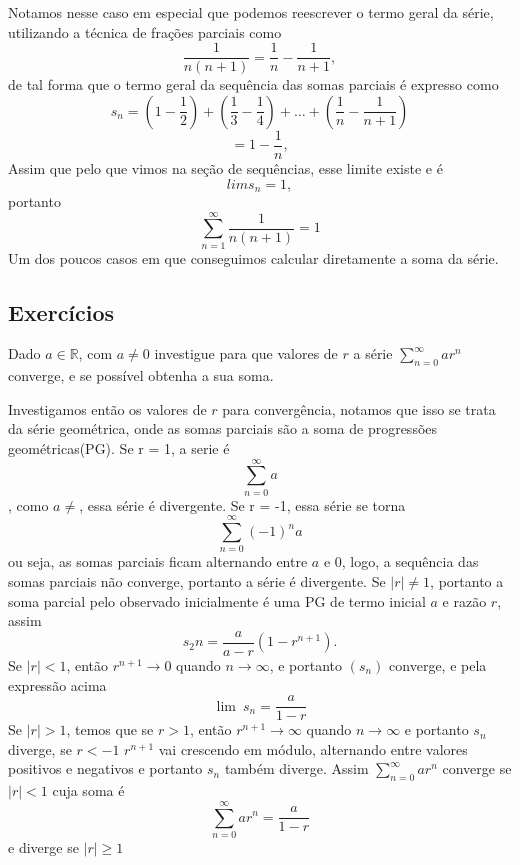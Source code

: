 \begin{resol}
    Notamos nesse caso em especial que podemos reescrever o termo geral da série,
    utilizando a técnica de frações parciais como
    $$\frac{1}{n(n+1)} = \frac{1}{n} - \frac{1}{n+1},$$
    de tal forma que o termo geral da sequência das somas parciais é expresso como
    $$s_n = (1 - \frac{1}{2})+(\frac{1}{3}-\frac{1}{4})+\dots+(\frac{1}{n}-\frac{1}{n+1})$$
    $$ = 1 - \frac{1}{n},$$
    Assim que pelo que vimos na seção de sequências, esse limite existe e é
    $$lim s_n = 1,$$
    portanto
    $$\sum_{n = 1}^{\infty} \frac{1}{n(n+1)} = 1$$
    Um dos poucos casos em que conseguimos calcular diretamente a soma da série.
\end{resol}

\subsection*{Exercícios}

\construirExer

\begin{exer}
    Dado $a \in \mathbb{R}$, com $a \neq 0$ investigue para que valores de $r$ a
    série $\sum_{n = 0}^{\infty} ar^n$ converge, e se possível obtenha a sua soma.
\end{exer}

\begin{resp}
    Investigamos então os valores de $r$ para convergência, notamos que isso se
    trata da série geométrica, onde as somas parciais são a soma de progressões
    geométricas(PG). Se r = 1, a serie é 
    $$ \sum_{n = 0}^{\infty} a$$,
    como $a \neq $, essa série é divergente.
    Se r = -1, essa série se torna
    $$ \sum_{n = 0}^{\infty} (-1)^n a$$
    ou seja, as somas parciais ficam alternando entre $a$ e $0$, logo, 
    a sequência das somas parciais não converge, portanto a série é divergente.
    Se $|r| \neq 1$, portanto a soma parcial pelo observado inicialmente é uma
    PG de termo inicial $a$ e razão $r$, assim
    $$s_2n = \frac{a}{a-r}(1-r^{n+1}).$$
    Se $|r| < 1$, então $r^{n+1} \to 0$ quando $n \to \infty$, e portanto $(s_n)$
    converge, e pela expressão acima
    $$ \lim{\:} s_n = \frac{a}{1-r}$$
    Se $|r|> 1$, temos que se $r>1$, então $r^{n+1} \to \infty$ quando
    $n \to \infty$ e portanto $s_n$ diverge, se $r<-1$ $r^{n+1}$ vai crescendo 
    em módulo, alternando entre valores positivos e negativos e portanto $s_n$
    também diverge.
    Assim $\sum_{n = 0}^{\infty} ar^n$ converge se $|r| <1$ cuja soma é 
    $$\sum_{n = 0}^{\infty} ar^n = \frac{a}{1-r}$$
    e diverge se $|r| \geq 1$
\end{resp}

